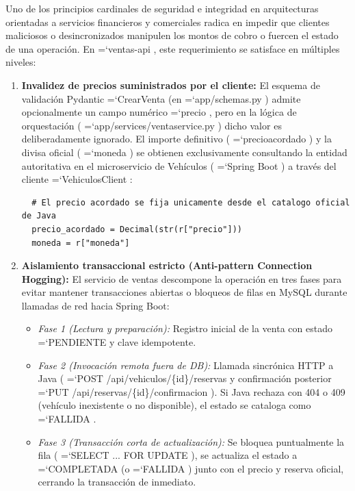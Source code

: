 \documentclass[11pt,a4paper]{article}
\renewcommand{\_}{\oldunderscore\allowbreak}
\DeclareRobustCommand{\texttt}[1]{%
  {\upshape\ttfamily\fontsize{9}{10.8}\selectfont\hyphenchar\font=`\-\relax #1}%
}
\begin{document}
\noindent Uno de los principios cardinales de seguridad e integridad en arquitecturas orientadas a servicios financieros y comerciales radica en impedir que clientes maliciosos o desincronizados manipulen los montos de cobro o fuercen el estado de una operación. En \texttt{ventas-api}, este requerimiento se satisface en múltiples niveles:
\begin{enumerate}[leftmargin=*,itemsep=2pt,topsep=1pt]
  \item \textbf{Invalidez de precios suministrados por el cliente:} El esquema de validación Pydantic \texttt{CrearVenta} (en \texttt{app/\allowbreak{}schemas.\allowbreak{}py}) admite opcionalmente un campo numérico \texttt{precio}, pero en la lógica de orquestación (\texttt{app/\allowbreak{}services/\allowbreak{}venta\_service.\allowbreak{}py}) dicho valor es deliberadamente ignorado. El importe definitivo (\texttt{precio\_acordado}) y la divisa oficial (\texttt{moneda}) se obtienen exclusivamente consultando la entidad autoritativa en el microservicio de Vehículos (\texttt{Spring Boot}) a través del cliente \texttt{VehiculosClient}:
  {\small
  \begin{lstlisting}
  # El precio acordado se fija unicamente desde el catalogo oficial de Java
  precio_acordado = Decimal(str(r["precio"]))
  moneda = r["moneda"]
  \end{lstlisting}
  }
  \item \textbf{Aislamiento transaccional estricto (Anti-pattern Connection Hogging):} El servicio de ventas descompone la operación en tres fases para evitar mantener transacciones abiertas o bloqueos de filas en MySQL durante llamadas de red hacia Spring Boot:
  \begin{itemize}[leftmargin=*,itemsep=1pt]
    \item \textit{Fase 1 (Lectura y preparación):} Registro inicial de la venta con estado \texttt{PENDIENTE} y clave idempotente.
    \item \textit{Fase 2 (Invocación remota fuera de DB):} Llamada sincrónica HTTP a Java (\texttt{POST /\allowbreak{}api/\allowbreak{}vehiculos/\allowbreak{}\{id\}/\allowbreak{}reservas} y confirmación posterior \texttt{PUT /\allowbreak{}api/\allowbreak{}reservas/\allowbreak{}\{id\}/\allowbreak{}confirmacion}). Si Java rechaza con 404 o 409 (vehículo inexistente o no disponible), el estado se cataloga como \texttt{FALLIDA}.
    \item \textit{Fase 3 (Transacción corta de actualización):} Se bloquea puntualmente la fila (\texttt{SELECT ... FOR UPDATE}), se actualiza el estado a \texttt{COMPLETADA} (o \texttt{FALLIDA}) junto con el precio y reserva oficial, cerrando la transacción de inmediato.
  \end{itemize}
\end{enumerate}
\end{document}
